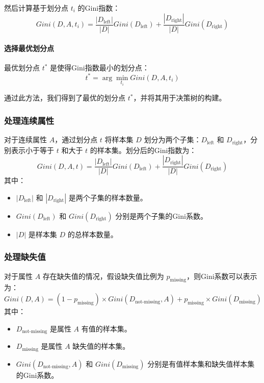 然后计算基于划分点 \(t_i\) 的Gini指数：
\begin{equation}
Gini(D, A, t_i) = \frac{|D_{\text{left}}|}{|D|} Gini(D_{\text{left}}) + \frac{|D_{\text{right}}|}{|D|} Gini(D_{\text{right}})
\end{equation}

\paragraph{选择最优划分点}
最优划分点 \(t^*\) 是使得Gini指数最小的划分点：
\begin{equation}
t^* = \arg\min_{t_i} Gini(D, A, t_i)
\end{equation}

通过此方法，我们得到了最优的划分点 \(t^*\)，并将其用于决策树的构建。






\subsubsection{处理连续属性}
对于连续属性 \(A\)，通过划分点 \(t\) 将样本集 \(D\) 划分为两个子集：\(D_{\text{left}}\) 和 \(D_{\text{right}}\)，分别表示小于等于 \(t\) 和大于 \(t\) 的样本集。划分后的Gini指数为：
\begin{equation}
Gini(D, A, t) = \frac{|D_{\text{left}}|}{|D|} Gini(D_{\text{left}}) + \frac{|D_{\text{right}}|}{|D|} Gini(D_{\text{right}})
\end{equation}
其中：
\begin{itemize}
  \item \(|D_{\text{left}}|\) 和 \(|D_{\text{right}}|\) 是两个子集的样本数量。
  \item \(Gini(D_{\text{left}})\) 和 \(Gini(D_{\text{right}})\) 分别是两个子集的Gini系数。
  \item \(|D|\) 是样本集 \(D\) 的总样本数量。
\end{itemize}

\subsubsection{处理缺失值}
对于属性 \(A\) 存在缺失值的情况，假设缺失值比例为 \(p_{\text{missing}}\)，则Gini系数可以表示为：
\begin{equation}
Gini(D, A) = (1 - p_{\text{missing}}) \times Gini(D_{\text{not-missing}}, A) + p_{\text{missing}} \times Gini(D_{\text{missing}})
\end{equation}
其中：
\begin{itemize}
  \item \(D_{\text{not-missing}}\) 是属性 \(A\) 有值的样本集。
  \item \(D_{\text{missing}}\) 是属性 \(A\) 缺失值的样本集。
  \item \(Gini(D_{\text{not-missing}}, A)\) 和 \(Gini(D_{\text{missing}})\) 分别是有值样本集和缺失值样本集的Gini系数。
\end{itemize}

